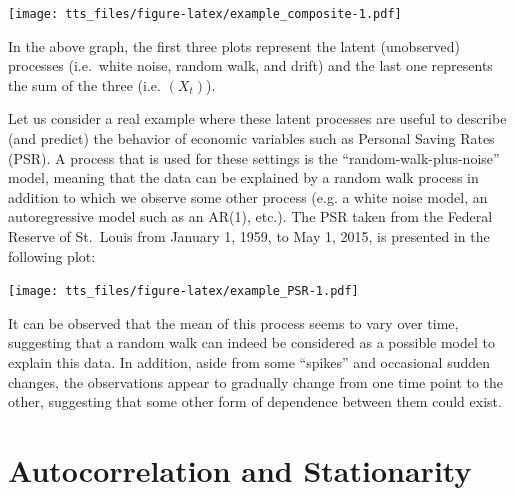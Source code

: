\documentclass[]{book}
\newenvironment{Shaded}{\begin{snugshade}}{\end{snugshade}}
\newcommand{\CommentTok}[1]{\textcolor[rgb]{0.56,0.35,0.01}{\textit{#1}}}
\newcommand{\DataTypeTok}[1]{\textcolor[rgb]{0.13,0.29,0.53}{#1}}
\newcommand{\DecValTok}[1]{\textcolor[rgb]{0.00,0.00,0.81}{#1}}
\newcommand{\KeywordTok}[1]{\textcolor[rgb]{0.13,0.29,0.53}{\textbf{#1}}}
\newcommand{\NormalTok}[1]{#1}
\newcommand{\StringTok}[1]{\textcolor[rgb]{0.31,0.60,0.02}{#1}}
\theoremstyle{definition}
\theoremstyle{definition}
\theoremstyle{definition}
\theoremstyle{remark}
\begin{document}
\texttt{[image: tts\_files/figure-latex/example\_composite-1.pdf]}

In the above graph, the first three plots represent the latent
(unobserved) processes (i.e.~white noise, random walk, and drift) and
the last one represents the sum of the three (i.e. \((X_t)\)).

Let us consider a real example where these latent processes are useful
to describe (and predict) the behavior of economic variables such as
Personal Saving Rates (PSR). A process that is used for these settings
is the ``random-walk-plus-noise'' model, meaning that the data can be
explained by a random walk process in addition to which we observe some
other process (e.g. a white noise model, an autoregressive model such as
an AR(1), etc.). The PSR taken from the Federal Reserve of St.~Louis
from January 1, 1959, to May 1, 2015, is presented in the following
plot:

\begin{Shaded}
\end{Shaded}

\texttt{[image: tts\_files/figure-latex/example\_PSR-1.pdf]}

It can be observed that the mean of this process seems to vary over
time, suggesting that a random walk can indeed be considered as a
possible model to explain this data. In addition, aside from some
``spikes'' and occasional sudden changes, the observations appear to
gradually change from one time point to the other, suggesting that some
other form of dependence between them could exist.

\hypertarget{autocorrelation-and-stationarity}{%
\chapter{Autocorrelation and
Stationarity}\label{autocorrelation-and-stationarity}}
\end{document}
